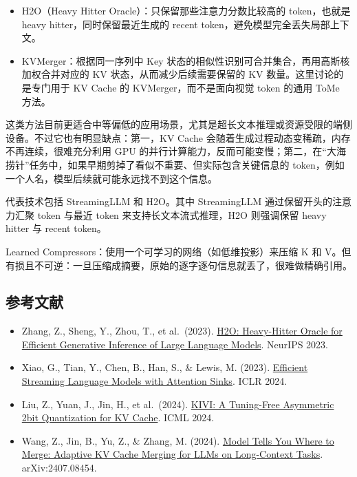 \begin{itemize}
\tightlist
\item
  H2O（Heavy Hitter Oracle）：只保留那些注意力分数比较高的 token，也就是 heavy hitter，同时保留最近生成的 recent token，避免模型完全丢失局部上下文。
\item
  KVMerger：根据同一序列中 Key 状态的相似性识别可合并集合，再用高斯核加权合并对应的 KV 状态，从而减少后续需要保留的 KV 数量。这里讨论的是专门用于 KV Cache 的 KVMerger，而不是面向视觉 token 的通用 ToMe 方法。
\end{itemize}

这类方法目前更适合中等偏低的应用场景，尤其是超长文本推理或资源受限的端侧设备。不过它也有明显缺点：第一，KV Cache 会随着生成过程动态变稀疏，内存不再连续，很难充分利用 GPU 的并行计算能力，反而可能变慢；第二，在``大海捞针''任务中，如果早期剪掉了看似不重要、但实际包含关键信息的 token，例如一个人名，模型后续就可能永远找不到这个信息。

代表技术包括 StreamingLLM 和 H2O。其中 StreamingLLM 通过保留开头的注意力汇聚 token 与最近 token 来支持长文本流式推理，H2O 则强调保留 heavy hitter 与 recent token。

Learned Compressors：使用一个可学习的网络（如低维投影）来压缩 K 和 V。但有损且不可逆：一旦压缩成摘要，原始的逐字逐句信息就丢了，很难做精确引用。

\FloatBarrier
{}
\hypertarget{ux53c2ux8003ux6587ux732e-96}{%
\subsection{参考文献}\label{ux53c2ux8003ux6587ux732e-96}}

\vspace{0.25em}
\begin{itemize}
\tightlist
\item
  Zhang, Z., Sheng, Y., Zhou, T., et al.~(2023). \href{https://arxiv.org/abs/2306.14048}{H2O: Heavy-Hitter Oracle for Efficient Generative Inference of Large Language Models}. NeurIPS 2023.
\item
  Xiao, G., Tian, Y., Chen, B., Han, S., \& Lewis, M. (2023). \href{https://arxiv.org/abs/2309.17453}{Efficient Streaming Language Models with Attention Sinks}. ICLR 2024.
\item
  Liu, Z., Yuan, J., Jin, H., et al.~(2024). \href{https://arxiv.org/abs/2402.02750}{KIVI: A Tuning-Free Asymmetric 2bit Quantization for KV Cache}. ICML 2024.
\item
  Wang, Z., Jin, B., Yu, Z., \& Zhang, M. (2024). \href{https://arxiv.org/abs/2407.08454}{Model Tells You Where to Merge: Adaptive KV Cache Merging for LLMs on Long-Context Tasks}. arXiv:2407.08454.
\end{itemize}

\clearpage
